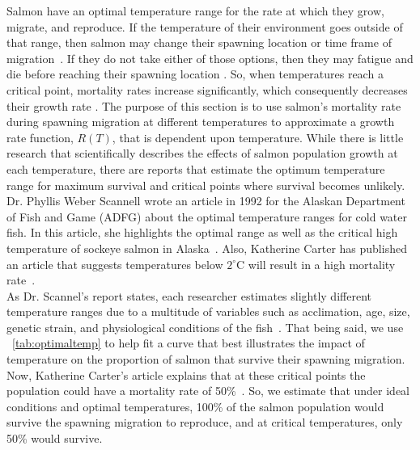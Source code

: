 Salmon have an optimal temperature range for the rate at which they grow, migrate, and reproduce. 
If the temperature of their environment goes outside of that range, then salmon may change their spawning location or time frame of migration~\cite{ADFG-optimal}.
If they do not take either of those options, then they may fatigue and die before reaching their spawning location \cite{ADFG-optimal, ADFG-critical}.
So, when temperatures reach a critical point, mortality rates increase significantly, which consequently decreases their growth rate \cite{ADFG-optimal}.
The purpose of this section is to use salmon's mortality rate during spawning migration at different temperatures to approximate a growth rate function, $R(T)$, that is dependent upon temperature.
While there is little research that scientifically describes the effects of salmon population growth at each temperature, there are reports that estimate the optimum temperature range for maximum survival and critical points where survival becomes unlikely.
Dr. Phyllis Weber Scannell wrote an article in 1992 for the Alaskan Department of Fish and Game (ADFG) about the optimal temperature ranges for cold water fish.
In this article, she highlights the optimal range as well as the critical high temperature of sockeye salmon in Alaska~\cite{ADFG-optimal}.
Also, Katherine Carter has published an article that suggests temperatures below $2^{\circ}$C will result in a high mortality rate~\cite{carter2005effects}.\\

As Dr. Scannel's report states, each researcher estimates slightly different temperature ranges due to a multitude of variables such as acclimation, age, size, genetic strain, and physiological conditions of the fish~\cite{ADFG-optimal}.
That being said, we use \tablename~\ref{tab:optimaltemp} to help fit a curve that best illustrates the impact of temperature on the proportion of salmon that survive their spawning migration.
Now, Katherine Carter's article explains that at these critical points the population could have a mortality rate of 50\%~\cite{carter2005effects}.
So, we estimate that under ideal conditions and optimal temperatures, 100\% of the salmon population would survive the spawning migration to reproduce, and at critical temperatures, only 50\% would survive.
